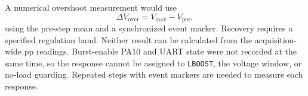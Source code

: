 A numerical overshoot measurement would use
\begin{equation}
\Delta V_\mathrm{over}=V_\mathrm{max}-V_\mathrm{pre},
\end{equation}
using the pre-step mean and a synchronized event marker. Recovery requires
a specified regulation band. Neither result can be calculated from the
acquisition-wide pp readings. Burst-enable PA10 and UART state were not
recorded at the same time, so the response cannot be assigned to
\texttt{LBOOST}, the voltage window, or no-load guarding. Repeated steps
with event markers are needed to measure each response.
